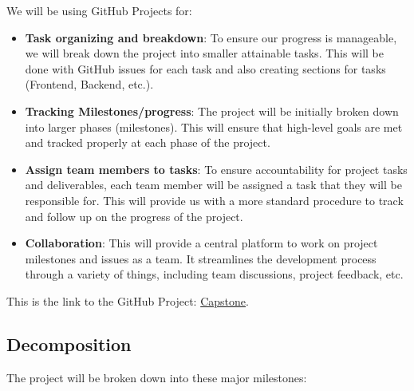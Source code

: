 \documentclass{article}
\begin{document}
We will be using GitHub Projects for:
\begin{itemize}
    \item \textbf{Task organizing and breakdown}: To ensure our progress is manageable, we will break down the project into smaller attainable tasks. This will be done with GitHub issues for each task and also creating sections for tasks (Frontend, Backend, etc.).
    \item \textbf{Tracking Milestones/progress}: The project will be initially broken down into larger phases (milestones). This will ensure that high-level goals are met and tracked properly at each phase of the project.
    \item \textbf{Assign team members to tasks}: To ensure accountability for project tasks and deliverables, each team member will be assigned a task that they will be responsible for. This will provide us with a more standard procedure to track and follow up on the progress of the project.
    \item \textbf{Collaboration}: This will provide a central platform to work on project milestones and issues as a team. It streamlines the development process through a variety of things, including team discussions, project feedback, etc.
\end{itemize}

This is the link to the GitHub Project: \href{https://github.com/users/dcheung11/projects/1}{Capstone}.

\subsection{Decomposition}
The project will be broken down into these major milestones:
\end{document}
